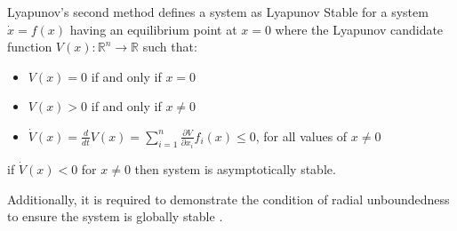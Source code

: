 Lyapunov's second method defines a system as Lyapunov Stable for a system $\dot{x}=f(x)$ having an equilibrium point at $x=0$ where the Lyapunov candidate function $V(x):\mathbb{R}^n \rightarrow \mathbb{R}$ such that:
\begin{itemize}
 \item $V(x)=0$ if and only if $x=0$
 \item $V(x)>0$ if and only if $x\neq0$
 \item $\dot{V}(x)=\frac{d}{dt}V(x)=\sum\limits_{i=1}^{n} \frac{\partial V}{\partial x_i}f_i(x) \leq 0$, for all values of $x\neq 0$  
\end{itemize}

if $\dot{V}(x) < 0$ for $x\neq 0$ then system is asymptotically stable.

Additionally, it is required to demonstrate the condition of radial unboundedness to ensure the system is globally stable \cite{khalil1996noninear}.